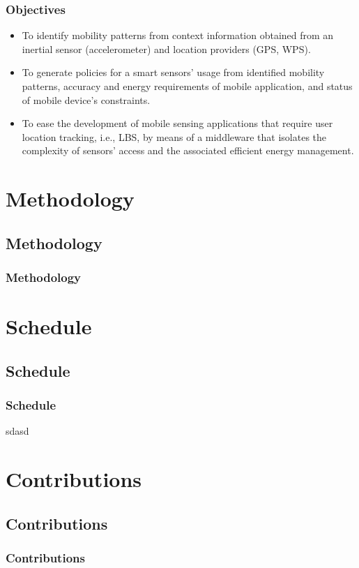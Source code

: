 \documentclass[compress,9pt,xcolor={dvipsnames,table}]{beamer}
\begin{document}
\begin{frame}\frametitle{Objectives}
\begin{tcolorbox}[title=Particular objectives,colframe=PineGreen]
\small
\begin{itemize}
  \item To identify mobility patterns from context information obtained from an inertial sensor (accelerometer) and location providers (GPS, WPS).
  \item To generate policies for a smart sensors' usage from identified mobility patterns, accuracy and energy requirements of mobile application, and status of mobile device's constraints. 
  \item To ease the development of mobile sensing applications that require user location tracking, i.e., LBS, by means of a middleware that isolates the complexity of sensors' access and the associated efficient energy management.
\end{itemize}
\end{tcolorbox}
\end{frame}


\section{Methodology}
\subsection{Methodology}
\begin{frame}\frametitle{Methodology}

\end{frame}


\section{Schedule}
\subsection{Schedule}
\begin{frame}\frametitle{Schedule}
sdasd
\end{frame}


\section{Contributions}
\subsection{Contributions}
\begin{frame}\frametitle{Contributions}

\end{frame}
\end{document}
